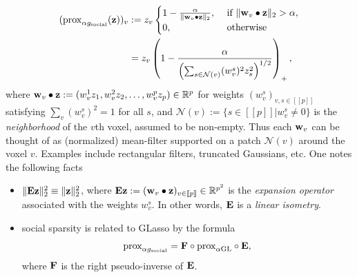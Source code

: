  \begin{equation}
   \begin{split}
     (\operatorname{prox}_{\alpha g_{\text{social}}}(\mathbf{z}))_v &:=
     z_v\begin{cases}1 - \frac{\alpha}{\|\mathbf{w}_v \bullet \mathbf{z}\|_2}, &\mbox{ if }\|\mathbf{w}_v \bullet \mathbf{z}\|_2 > \alpha
       ,\\0, &\mbox{ otherwise}\end{cases}\\
     &=
     z_v\left(1 - \frac{\alpha}{\left(\sum_{s \in \mathcal N(v)}(w^{s}_{v})^2z_{s}^2\right)^{1/2}}\right)_+, 
     \end{split}
  \label{eq:social}
\end{equation}
where $\mathbf{w}_v \bullet \mathbf{z} := (w^1_v z_1,w^2_v z_2,\ldots,w^p_v z_p) \in \mathbb R^p$ for weights
$(w^s_v)_{v,s \in [\![p]\!]}$ satisfying $\sum_v (w^s_v)^2 = 1$ for all $s$, and $\mathcal N (v) := \{s \in [\![p]\!] | w^s_v \ne 0\}$ is the \textit{neighborhood} of the $v$th voxel, assumed to be non-empty. Thus each $\mathbf{w}_v$ can be thought of as
(normalized) mean-filter supported on a patch $\mathcal N(v)$ around the voxel $v$.
Examples include rectangular filters, truncated Gaussians, etc.
One notes the following facts
\begin{itemize}
\item $\|\mathbf{E}\mathbf{z}\|^2_2 \equiv \|\mathbf{z}\|^2_2$, where $\mathbf{E}\mathbf{z} := (\mathbf{w}_v \bullet \mathbf{z})_{v \in [\![p]\!]} \in \mathbb R^{p^2}$
  is the \textit{expansion operator} associated with the weights $w^s_v$. In other words, $\mathbf{E}$ is a \textit{linear isometry}.
\item social sparsity is related to GLasso by the formula
  \begin{equation}
    \text{prox}_{\alpha g_{\text{social}}} = \mathbf{F} \circ \text{prox}_{\alpha \text{GL}} \circ \mathbf{E},
  \end{equation}
  where $\mathbf{F}$ is the right pseudo-inverse of $\mathbf{E}$.
\end{itemize}


\clearpage


